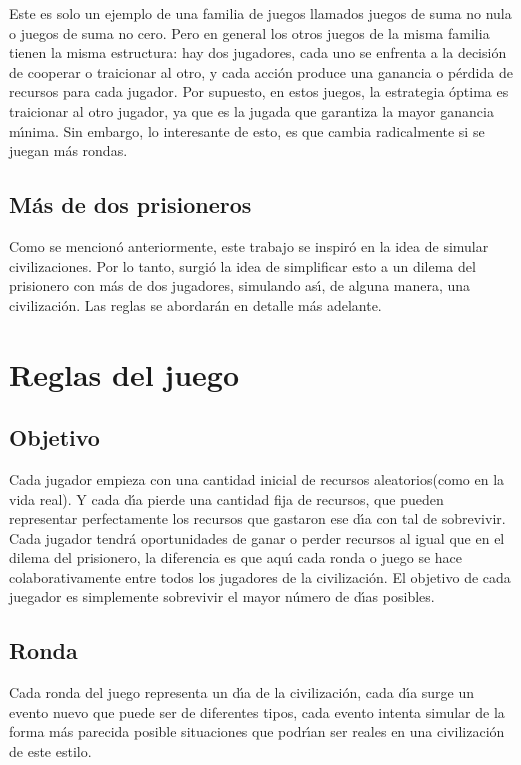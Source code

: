 \documentclass{article}
\begin{document}
Este es solo un ejemplo de una familia de juegos llamados juegos de suma no nula o juegos de suma no cero. Pero en general los otros juegos de la misma familia
tienen la misma estructura: hay dos jugadores, cada uno se enfrenta a la decisi\'on de cooperar o traicionar al otro, y cada acci\'on produce una ganancia o
p\'erdida de recursos para cada jugador. Por supuesto, en estos juegos, la estrategia \'optima es traicionar al otro jugador, ya que es la jugada que garantiza
la mayor ganancia m\'{\i}nima. Sin embargo, lo interesante de esto, es que cambia radicalmente si se juegan m\'as rondas.

\subsection*{M\'as de dos prisioneros}
Como se mencion\'o anteriormente, este trabajo se inspir\'o en la idea de simular civilizaciones. Por lo tanto, surgi\'o la idea de simplificar esto
a un dilema del prisionero con m\'as de dos jugadores, simulando as\'{\i}, de alguna manera, una civilizaci\'on. Las reglas se abordar\'an en detalle
m\'as adelante.
\newpage

\section{Reglas del juego}
\vspace*{5mm}
\subsection{Objetivo}
Cada jugador empieza con una cantidad inicial de recursos aleatorios(como en la vida real). Y cada d\'{\i}a pierde una cantidad fija de recursos, que pueden
representar perfectamente los recursos que gastaron ese d\'{\i}a con tal de sobrevivir. Cada jugador tendr\'a oportunidades de ganar o perder recursos al igual
que en el dilema del prisionero, la diferencia es que aqu\'{\i} cada ronda o juego se hace colaborativamente entre todos los jugadores de la civilizaci\'on.
El objetivo de cada juegador es simplemente sobrevivir el mayor n\'umero de d\'{\i}as posibles.

\subsection{Ronda}
Cada ronda del juego representa un d\'{\i}a de la civilizaci\'on, cada d\'{\i}a surge un evento nuevo que puede ser de diferentes tipos, cada evento intenta
simular de la forma m\'as parecida posible situaciones que podr\'{\i}an ser reales en una civilizaci\'on de este estilo.
\end{document}
